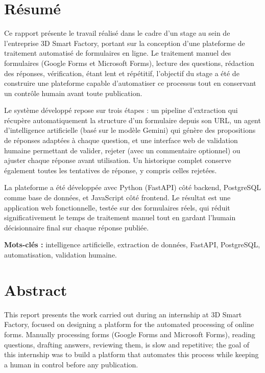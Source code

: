 \documentclass[12pt,a4paper]{report}
\begin{document}
\chapter*{Résumé}


Ce rapport présente le travail réalisé dans le cadre d'un stage au sein de
l'entreprise 3D Smart Factory, portant sur la conception d'une plateforme de
traitement automatisé de formulaires en ligne. Le traitement manuel des
formulaires (Google Forms et Microsoft Forms), lecture des questions,
rédaction des réponses, vérification, étant lent et répétitif, l'objectif
du stage a été de construire une plateforme capable d'automatiser ce
processus tout en conservant un contrôle humain avant toute publication.

Le système développé repose sur trois étapes : un pipeline d'extraction qui
récupère automatiquement la structure d'un formulaire depuis son URL, un
agent d'intelligence artificielle (basé sur le modèle Gemini) qui génère des
propositions de réponses adaptées à chaque question, et une interface web
de validation humaine permettant de valider, rejeter (avec un commentaire
optionnel) ou ajuster chaque réponse avant utilisation. Un
historique complet conserve également toutes
les tentatives de réponse, y compris celles rejetées.

La plateforme a été développée avec Python (FastAPI) côté backend,
PostgreSQL comme base de données, et JavaScript côté frontend. Le résultat
est une application web fonctionnelle, testée sur des formulaires réels, qui
réduit significativement le temps de traitement manuel tout en gardant
l'humain décisionnaire final sur chaque réponse publiée.

\textbf{Mots-clés :} intelligence artificielle, extraction de données,
FastAPI, PostgreSQL, automatisation, validation humaine.

\chapter*{Abstract}

This report presents the work carried out during an internship at 3D Smart
Factory, focused on designing a platform for the automated processing of
online forms. Manually processing forms (Google Forms and Microsoft
Forms), reading questions, drafting answers, reviewing them, is slow
and repetitive; the goal of this internship was to build a platform that
automates this process while keeping a human in control before any
publication.
\end{document}
